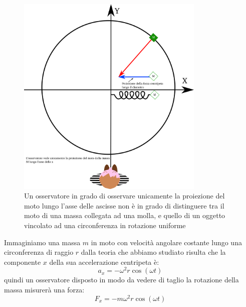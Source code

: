 \documentclass[a4paper,10pt,oneside]{article}
\begin{document}
\begin{figure}[H]
 \centering
 \includegraphics[width=0.8\textwidth]{./immagini/armonico_vista.png}
 \caption{Un osservatore in grado di osservare unicamente la proiezione del moto lungo l'asse delle ascisse non è in grado di distinguere tra il moto di una massa collegata ad una molla, e quello di un oggetto vincolato ad una circonferenza in rotazione uniforme}\label{fig:armonico1}
\end{figure}


Immaginiamo una massa $m$ in moto con velocità angolare costante lungo una circonferenza di raggio $r$ dalla teoria che abbiamo studiato risulta che la componente $x$ della sua accelerazione centripeta è:
\begin{equation}
 a_x=-\omega^2r\cos(\omega t)
\end{equation}
quindi un osservatore disposto in modo da vedere di taglio la rotazione della massa misurerà una forza:
\begin{equation}
 F_x=-m\omega^2r\cos(\omega t)
\end{equation}
\end{document}
